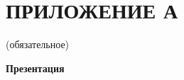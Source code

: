 \documentclass[a4paper,14pt, unknownkeysallowed]{extreport}
\begin{document}












\chapter*{ПРИЛОЖЕНИЕ А}
\begin{center}
    (обязательное)
    
    \textbf{Презентация}
\end{center}

\end{document}
